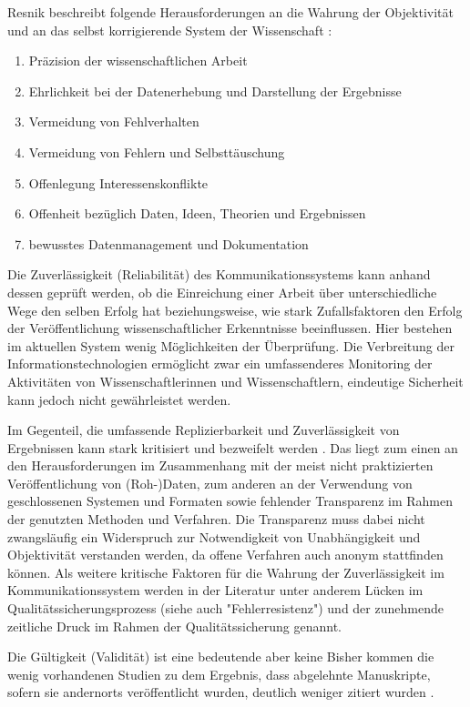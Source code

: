 Resnik beschreibt folgende Herausforderungen an die Wahrung der Objektivität und an das selbst korrigierende System der Wissenschaft \cite{resnik_2005_ethics}:
\begin{enumerate}
\item Präzision der wissenschaftlichen Arbeit
\item Ehrlichkeit bei der Datenerhebung und Darstellung der Ergebnisse
\item Vermeidung von Fehlverhalten
\item Vermeidung von Fehlern und Selbsttäuschung
\item Offenlegung Interessenskonflikte
\item Offenheit bezüglich Daten, Ideen, Theorien und  Ergebnissen
\item bewusstes Datenmanagement und Dokumentation
\end{enumerate}

Die Zuverlässigkeit (Reliabilität) des Kommunikationssystems kann anhand dessen geprüft werden, ob die Einreichung einer Arbeit über unterschiedliche Wege den selben Erfolg hat beziehungsweise, wie stark Zufallsfaktoren den Erfolg der Veröffentlichung wissenschaftlicher Erkenntnisse beeinflussen. Hier bestehen im aktuellen System wenig Möglichkeiten der Überprüfung. Die Verbreitung der Informationstechnologien ermöglicht zwar ein umfassenderes Monitoring der Aktivitäten von Wissenschaftlerinnen und Wissenschaftlern, eindeutige Sicherheit kann jedoch nicht gewährleistet werden.

Im Gegenteil, die umfassende Replizierbarkeit und Zuverlässigkeit von Ergebnissen kann stark kritisiert und bezweifelt werden \cite{Luescher_2014}. Das liegt zum einen an den Herausforderungen im Zusammenhang mit der meist nicht praktizierten Veröffentlichung von (Roh-)Daten, zum anderen an der Verwendung von geschlossenen Systemen und Formaten sowie fehlender Transparenz im Rahmen der genutzten Methoden und Verfahren. Die Transparenz muss dabei nicht zwangsläufig ein Widerspruch zur Notwendigkeit von Unabhängigkeit und Objektivität verstanden werden, da offene Verfahren auch anonym stattfinden können. Als weitere kritische Faktoren für die Wahrung der Zuverlässigkeit im Kommunikationssystem werden in der Literatur unter anderem Lücken im Qualitätssicherungsprozess (siehe auch "Fehlerresistenz") \cite{bar_2009_wissenschaftliche} und der zunehmende zeitliche Druck im Rahmen der Qualitätssicherung \cite{Luescher_2014} genannt.

Die Gültigkeit (Validität) ist eine bedeutende aber keine
Bisher kommen die wenig vorhandenen Studien zu dem Ergebnis, dass abgelehnte Manuskripte, sofern sie andernorts veröffentlicht wurden, deutlich weniger zitiert wurden \cite{Hornbostel_1997}.

